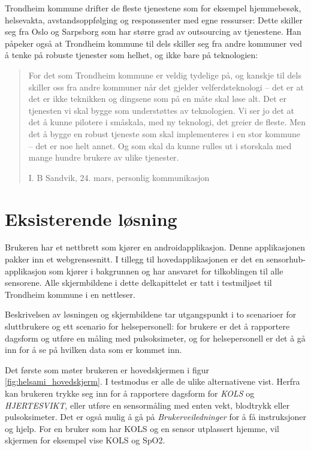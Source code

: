 Trondheim kommune drifter de fleste tjenestene som for eksempel hjemmebesøk, helsevakta, avstandsoppfølging og responssenter med egne ressurser:
Dette skiller seg fra Oslo og Sarpsborg som har større grad av outsourcing av tjenestene. Han påpeker også at Trondheim kommune til dels skiller
seg fra andre kommuner ved å tenke på robuste tjenester som helhet, og ikke bare på teknologien:
\blockquote[I. B Sandvik, 24. mars, personlig kommunikasjon]{For det som Trondheim kommune er
    veldig tydelige på, og kanskje til dels skiller oss fra andre kommuner når det gjelder velferdsteknologi -- det er at det er ikke teknikken og dingsene som på en måte skal
    løse alt. Det er tjenesten vi skal bygge som understøttes av teknologien.
    Vi ser jo det at det å kunne pilotere i småskala, med ny teknologi, det greier de fleste. Men det å bygge en robust tjeneste som skal implementeres i en stor kommune
-- det er noe helt annet. Og som skal da kunne rulles ut i storskala med mange hundre brukere av ulike tjenester.}

\section{Eksisterende løsning}
Brukeren har et nettbrett som kjører en androidapplikasjon. Denne applikasjonen pakker inn
et webgrensesnitt. I tillegg til hovedapplikasjonen er det en sensorhub-applikasjon som kjører i bakgrunnen
og har ansvaret for tilkoblingen til alle sensorene. Alle skjermbildene i dette delkapittelet er tatt i testmiljøet
til Trondheim kommune i en nettleser.

Beskrivelsen av løsningen og skjermbildene tar utgangspunkt i to scenarioer for sluttbrukere
og ett scenario for helsepersonell: for brukere er det å rapportere dagsform og utføre en måling med pulsoksimeter,
og for helsepersonell er det å gå inn for å se på hvilken data som er kommet inn.

Det første som møter brukeren er hovedskjermen i figur \ref{fig:helsami_hovedskjerm}. I testmodus er alle de ulike
alternativene vist.
Herfra kan brukeren trykke seg inn for å rapportere dagsform for \textit{KOLS} og \textit{HJERTESVIKT}, eller utføre en sensormåling med
enten vekt, blodtrykk eller pulsoksimeter. Det er også mulig å gå på \textit{Brukerveiledninger} for å få instruksjoner og hjelp.
For en bruker som har KOLS og en sensor utplassert hjemme, vil skjermen for eksempel vise KOLS og SpO2.

